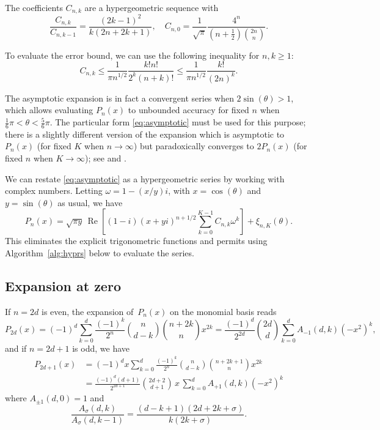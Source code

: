 \documentclass[11pt,a4paper]{article}
\begin{document}
The coefficients $C_{n,k}$ are a hypergeometric sequence with
$$\frac{C_{n,k}}{C_{n,k-1}} = \frac{(2k-1)^2}{k (2n+2k+1)}, \quad C_{n,0} = \frac{1}{\sqrt{\pi}} \frac{4^n}{(n+\tfrac{1}{2}) {2n \choose n}}.$$

To evaluate the error bound, we can use the following inequality for $n, k \ge 1$:
$$C_{n,k} \le \frac{1}{\pi n^{1/2}} \frac{k! n!}{2^k (n+k)!} \le \frac{1}{\pi n^{1/2}} \frac{k!}{(2n)^k}.$$

The asymptotic expansion is in fact a convergent series
when $2 \sin(\theta) > 1$, which allows evaluating $P_n(x)$ to unbounded
accuracy for fixed $n$ when $\tfrac{1}{6}\pi < \theta < \tfrac{5}{6} \pi$.
The particular form \eqref{eq:asymptotic}
must be used for this purpose; there is a slightly different version of the expansion
which is asymptotic to $P_n(x)$ (for fixed $K$ when $n \to \infty$)
but paradoxically
converges to $2 P_n(x)$ (for fixed $n$ when $K \to \infty$); see \cite{Olver1997} and \cite{Olver2010}.

We can restate \eqref{eq:asymptotic} as a hypergeometric series
by working with complex numbers.
Letting $\omega = 1 - (x/y) i$, with $x = \cos(\theta)$ and $y =
\sin(\theta)$ as usual, we have
\begin{equation}
\label{eq:asymptoticcomplex}
P_n(x) = \sqrt{\pi y} \, \operatorname{Re}\left[
(1-i) (x+y i)^{n+1/2}
\sum_{k=0}^{K-1} C_{n,k} \omega^k\right] + \xi_{n,K}(\theta).
\end{equation}
This eliminates the explicit trigonometric functions and permits using
Algorithm~\ref{alg:hyprs} below to evaluate the series.

\subsection{Expansion at zero}

If $n = 2d$ is even, the expansion of $P_n(x)$ on the monomial basis
reads
$$P_{2d}(x) = (-1)^d \sum_{k=0}^d \frac{(-1)^k}{2^n} {n \choose d-k} {n+2k \choose n} x^{2k} = \frac{(-1)^d}{2^{2d}} {2d \choose d} \sum_{k=0}^d A_{-1}(d,k) (-x^2)^k,$$
and if $n = 2d+1$ is odd, we have
\begin{align*}
P_{2d+1}(x) &= (-1)^d x \sum_{k=0}^d \frac{(-1)^k}{2^n} {n \choose d-k} {n+2k+1 \choose n} x^{2k} \\
&= \frac{(-1)^d (d+1)}{2^{2d+1}} {2d+2 \choose d+1} \,x\, \sum_{k=0}^d A_{+1}(d,k) (-x^2)^k
\end{align*}
where $A_{\pm 1}(d,0) = 1$ and
$$\frac{A_{\sigma}(d,k)}{A_{\sigma}(d,k-1)} = \frac{(d-k+1) (2d+2k+\sigma)}{k (2k+\sigma)}.$$
\end{document}
